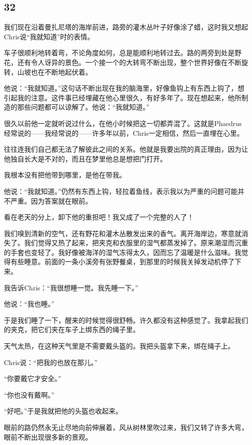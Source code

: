 \documentclass[UTF8]{article}
\begin{document}
\subsection*{32}
\par 我们现在沿着曼扎尼塔的海岸前进，路旁的灌木丛叶子好像涂了蜡，这时我又想起Chris说“我就知道”时的表情。
\par 车子很顺利地转着弯，不论角度如何，总是能顺利地转过去。路的两旁到处是野花，还有令人讶异的景色。一个接一个的大转弯不断出现，整个世界好像在不断旋转，山坡也在不断地起伏着。
\par 他说：“我就知道。”这句话不断出现在我的脑海里，好像鱼钩上有东西上钩了，想引起我的注意。这件事已经埋藏在他心里很久，有好多年了。现在想起来，他所制造的那些问题都可以谅解了。他说：“我就知道。”
\par 很久以前他一定就听说过什么，在他小时候把这一切都弄混了。这就是Phaedrus经常说的——我经常说的——许多年以前，Chris一定相信，然后一直埋在心里。
\par 往往连我们自己都无法了解彼此之间的关系。他就是我要出院的真正理由，因为让他独自长大是不对的，而且在梦里他总是想把门打开。
\par 我根本没有把他带到哪里，是他在带我。
\par 他说：“我就知道。”仍然有东西上钩，轻拉着鱼线，表示我以为严重的问题可能并不严重。因为答案就在眼前。
\par 看在老天的分上，卸下他的重担吧！我又成了一个完整的人了！
\par 我们嗅到清新的空气，还有野花和灌木丛散发出来的香气。离开海岸边，寒意就消失了。我们觉得又热了起来，把夹克和衣服里的湿气都蒸发掉了。原来潮湿而沉重的手套也变轻了。我好像被海洋的湿气冻得太久，因而忘了温暖是什么滋味。我觉得有些睡意。前面的一条小溪旁有张野餐桌，到那里的时候我关掉发动机停了下来。
\par 我告诉Chris：“我很想睡一觉。我先睡一下。”
\par 他说：“我也睡。”
\par 于是我们睡了一下，醒来的时候觉得很舒畅。许久都没有这种感觉了。我拿起我们的夹克，把它们夹在车子上绑东西的绳子里。
\par 天气太热，在这种天气里是不需要戴头盔的。我把头盔拿下来，绑在绳子上。
\par Chris说：“把我的也放在那儿。”
\par “你要戴它才安全。”
\par “你也没有戴啊。”
\par “好吧。”于是我就把他的头盔也收起来。
\par 眼前的路仍然永无止尽地向前伸展着，风从树林里吹过来，我们又转了许多大弯，眼前不断出现很多新的景观。
\end{document}
